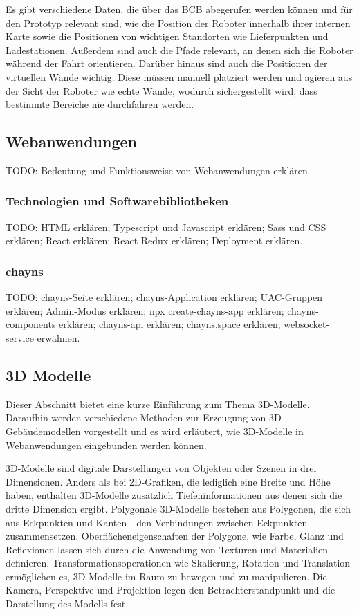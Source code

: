 Es gibt verschiedene Daten, die über das \ac{BCB} abegerufen werden können und für den Prototyp relevant sind, wie die Position der Roboter innerhalb ihrer internen Karte sowie die Positionen von wichtigen Standorten wie Lieferpunkten und Ladestationen. Außerdem sind auch die Pfade relevant, an denen sich die Roboter während der Fahrt orientieren. Darüber hinaus sind auch die Positionen der virtuellen Wände wichtig. Diese müssen manuell platziert werden und agieren aus der Sicht der Roboter wie echte Wände, wodurch sichergestellt wird, dass bestimmte Bereiche nie durchfahren werden.

\subsection{Webanwendungen}
TODO: Bedeutung und Funktionsweise von Webanwendungen erklären.

\subsubsection{Technologien und Softwarebibliotheken}\label{sec:WebTechnologies}
TODO: HTML erklären; Typescript und Javascript erklären; \ac{Sass} und CSS erklären; React erklären; React Redux erklären; Deployment erklären.

\subsubsection{chayns}\label{sec:Chayns}
TODO: chayns-Seite erklären; chayns-Application erklären; UAC-Gruppen erklären; Admin-Modus erklären; npx create-chayns-app erklären; chayns-components erklären; chayns-api erklären; chayns.space erklären; websocket-service erwähnen.

\subsection{3D Modelle}
Dieser Abschnitt bietet eine kurze Einführung zum Thema 3D-Modelle. Daraufhin werden verschiedene Methoden zur Erzeugung von 3D-Gebäudemodellen vorgestellt und es wird erläutert, wie 3D-Modelle in Webanwendungen eingebunden werden können.

3D-Modelle sind digitale Darstellungen von Objekten oder Szenen in drei Dimensionen. Anders als bei 2D-Grafiken, die lediglich eine Breite und Höhe haben, enthalten 3D-Modelle zusätzlich Tiefeninformationen aus denen sich die dritte Dimension ergibt. Polygonale 3D-Modelle bestehen aus Polygonen, die sich aus Eckpunkten und Kanten - den Verbindungen zwischen Eckpunkten - zusammensetzen. Oberflächeneigenschaften der Polygone, wie Farbe, Glanz und Reflexionen lassen sich durch die Anwendung von Texturen und Materialien definieren. Transformationsoperationen wie Skalierung, Rotation und Translation ermöglichen es, 3D-Modelle im Raum zu bewegen und zu manipulieren. Die Kamera, Perspektive und Projektion legen den Betrachterstandpunkt und die Darstellung des Modells fest.\cite[S.~8-16]{Parisi2014}

